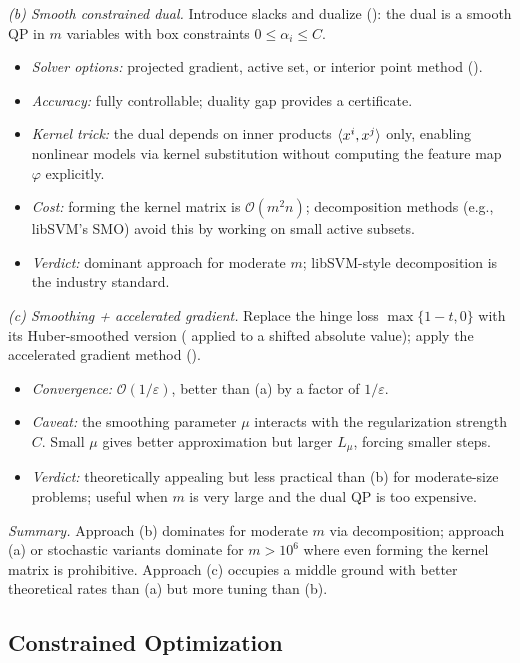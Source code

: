 \textit{(b) Smooth constrained dual.}
Introduce slacks and dualize (): the dual is a smooth QP in $m$ variables with box constraints $0 \leq \alpha_i \leq C$.
\begin{itemize}
	\item \textit{Solver options:} projected gradient, active set, or interior point method ().
	\item \textit{Accuracy:} fully controllable; duality gap provides a certificate.
	\item \textit{Kernel trick:} the dual depends on inner products $\langle x^i, x^j\rangle$ only, enabling nonlinear models via kernel substitution without computing the feature map $\varphi$ explicitly.
	\item \textit{Cost:} forming the kernel matrix is $\mathcal{O}(m^2 n)$; decomposition methods (e.g., libSVM's SMO) avoid this by working on small active subsets.
	\item \textit{Verdict:} dominant approach for moderate $m$; libSVM-style decomposition is the industry standard.
\end{itemize}

\textit{(c) Smoothing + accelerated gradient.}
Replace the hinge loss $\max\{1 - t, 0\}$ with its Huber-smoothed version ( applied to a shifted absolute value); apply the accelerated gradient method ().
\begin{itemize}
	\item \textit{Convergence:} $\mathcal{O}(1/\varepsilon)$, better than (a) by a factor of $1/\varepsilon$.
	\item \textit{Caveat:} the smoothing parameter $\mu$ interacts with the regularization strength $C$. Small $\mu$ gives better approximation but larger $L_\mu$, forcing smaller steps.
	\item \textit{Verdict:} theoretically appealing but less practical than (b) for moderate-size problems; useful when $m$ is very large and the dual QP is too expensive.
\end{itemize}

\textit{Summary.}
Approach (b) dominates for moderate $m$ via decomposition; approach (a) or stochastic variants dominate for $m > 10^6$ where even forming the kernel matrix is prohibitive.
Approach (c) occupies a middle ground with better theoretical rates than (a) but more tuning than (b).

\subsection{Constrained Optimization}\label{app:ex-constrained}

